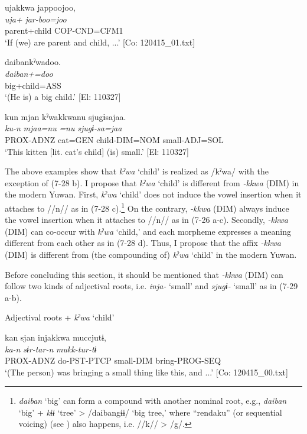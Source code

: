 \ex \label{ex:7:b}%
\glll  ujakkwa  jappoojoo,\\
\textit{uja+}  \textit{jar-boo=joo}\\
parent+child  COP-CND=CFM1\\
\glt ‘If (we) are parent and child, ...’ [Co: 120415\_01.txt]

\ex \label{ex:7:c}%
\glll  daibankˀwadoo.\\
\textit{daiban+=doo}\\
big+child=ASS\\
\glt ‘(He is) a big child.’ [El: 110327]

\ex \label{ex:7:d}%
\glll  kun  mjan  kˀwakkwanu  sjugɨsajaa.\\
\textit{ku-n}  \textit{mjaa=nu}  \textit{=nu}  \textit{sjugɨ-sa=jaa}\\
PROX-ADNZ  cat=GEN  child-DIM=NOM  small-ADJ=SOL\\
\glt ‘This kitten [lit. cat’s child] (is) small.’ [El: 110327]
\z
\z

The above examples show that \textit{kˀwa} ‘child’ is realized as /kˀwa/ with the exception of (7-28 b). I propose that \textit{kˀwa} ‘child’ is different from \textit{{}-kkwa} (DIM) in the modern Yuwan. First, \textit{kˀwa} ‘child’ does not induce the vowel insertion when it attaches to //n// as in (7-28 c).\footnote{\textit{daiban} ‘big’ can form a compound with another nominal root, e.g., \textit{daiban} ‘big’ + \textit{kɨɨ} ‘tree’ > /daibangɨɨ/ ‘big tree,’ where “rendaku” (or sequential voicing) (see ) also happens, i.e. //k// > /g/.} On the contrary, \textit{{}-kkwa} (DIM) always induce the vowel insertion when it attaches to //n// as in (7-26 a-c). Secondly, \textit{{}-kkwa} (DIM) can co-occur with \textit{kˀwa} ‘child,’ and each morpheme expresses a meaning different from each other as in (7-28 d). Thus, I propose that the affix \textit{{}-kkwa} (DIM) is different from (the compounding of) \textit{kˀwa} ‘child’ in the modern Yuwan.

  Before concluding this section, it should be mentioned that \textit{{}-kkwa} (DIM) can follow two kinds of adjectival roots, i.e. \textit{inja-} ‘small’ and \textit{sjugɨ-} ‘small’ as in (7-29 a-b).

\ea \label{ex:7:29}  Adjectival roots + \textit{kˀwa} ‘child’

\ea \label{ex:7:a}%
\glll  kan  sjan  injakkwa  muccjutɨ,\\
\textit{ka-n}  \textit{sɨr-tar-n}  \textit{}  \textit{mukk-tur-tɨ}\\
PROX-ADNZ  do-PST-PTCP  small-DIM  bring-PROG-SEQ\\
\glt ‘(The person) was bringing a small thing like this, and ...’ [Co: 120415\_00.txt]

